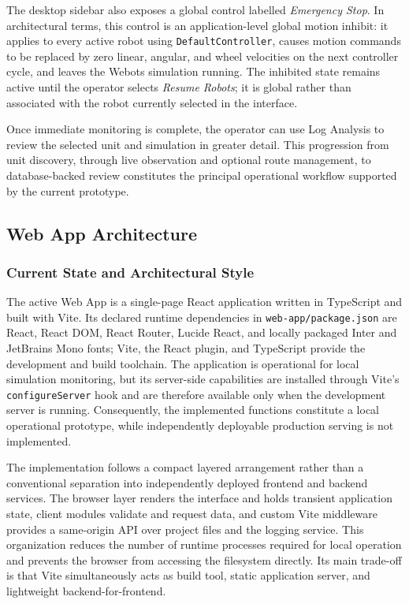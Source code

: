 The desktop sidebar also exposes a global control labelled \emph{Emergency Stop}. In architectural terms, this control is an application-level global motion inhibit: it applies to every active robot using \texttt{DefaultController}, causes motion commands to be replaced by zero linear, angular, and wheel velocities on the next controller cycle, and leaves the Webots simulation running. The inhibited state remains active until the operator selects \emph{Resume Robots}; it is global rather than associated with the robot currently selected in the interface.

Once immediate monitoring is complete, the operator can use Log Analysis to review the selected unit and simulation in greater detail. This progression from unit discovery, through live observation and optional route management, to database-backed review constitutes the principal operational workflow supported by the current prototype.

\subsection{Web App Architecture}
\label{subsec:webapp-architecture}

\subsubsection{Current State and Architectural Style}

The active Web App is a single-page React application written in TypeScript and built with Vite. Its declared runtime dependencies in \texttt{web-app/package.json} are React, React DOM, React Router, Lucide React, and locally packaged Inter and JetBrains Mono fonts; Vite, the React plugin, and TypeScript provide the development and build toolchain. The application is operational for local simulation monitoring, but its server-side capabilities are installed through Vite's \texttt{configureServer} hook and are therefore available only when the development server is running. Consequently, the implemented functions constitute a local operational prototype, while independently deployable production serving is not implemented.

The implementation follows a compact layered arrangement rather than a conventional separation into independently deployed frontend and backend services. The browser layer renders the interface and holds transient application state, client modules validate and request data, and custom Vite middleware provides a same-origin API over project files and the logging service. This organization reduces the number of runtime processes required for local operation and prevents the browser from accessing the filesystem directly. Its main trade-off is that Vite simultaneously acts as build tool, static application server, and lightweight backend-for-frontend.

